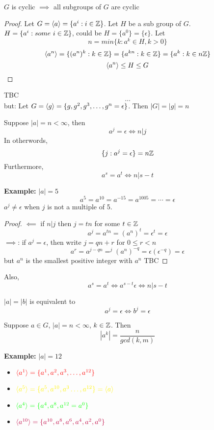 \documentclass[openany]{report}
\begin{document}
\begin{prop}
    $G$ is cyclic $\implies$ all subgroups of $G$ are cyclic
\end{prop}
\begin{proof}
    Let $G = \langle a \rangle = \{a^i : i \in \mathbb{Z}\}$. Let $H$ be a sub group of $G$. $H = \{a^i : some \ i\in \mathbb{Z}\}$, could be $H = \{a^0\} = \{\epsilon\}$. Let $$n = min\{k: a^k \in H, k > 0\}$$
        $$\langle a^n \rangle = \{(a^n)^k: k \in \mathbb{Z}\} = \{a^{kn} : k \in \mathbb{Z}\} = \{a^k: k \in n \mathbb{Z}\}$$ 
    $$\langle a^n \rangle \leq H \leq G$$
\end{proof}
TBC
$$\dots$$
but: Let $G = \langle g \rangle = \{g, g^2, g^3, \dots, g^n = \epsilon\}$. Then $|G| = |g| = n$
\begin{prop}
    Suppose $|a| = n < \infty$, then
    $$a^j = \epsilon \iff n|j$$
    In otherwords, 
    $$\{j: a^j = \epsilon\} = n\mathbb{Z}$$
    Furthermore, 
    $$a^s = a^t \iff n|s-t$$
\end{prop}
\textbf{Example:} $|a| = 5$ 
$$a^5 = a^{10} = a^{-15} = a^{1005} = \cdots = \epsilon$$
$a^j \neq \epsilon$ when $j$ is not a multiple of 5. 
\begin{proof}
    $\impliedby$ if $n|j$ then $j = tn$ for some $t\in \mathbb{Z}$
    $$a^j = a^{tn} = (a^n)^t = \epsilon^t = \epsilon$$
    $\implies$: if $a^j = \epsilon$, then write $j = qn + r$ for $0 \leq r < n$
    $$a^r = a^{j-qn} =
    ^j(a^n)^{-q} = \epsilon (\epsilon^{-q}) = \epsilon$$
     but $a^n$ is the smallest positive integer with $a^n$ TBC
\end{proof}
Also,
$$a^s = a^t \iff a^{s-t} \epsilon \iff n|s-t$$
\begin{corollary}
    $|a| = |b|$ is equivalent to 
    $$a^j = \epsilon \iff b^j = \epsilon$$
\end{corollary}
\begin{prop}
    Suppose $a \in G$, $|a| = n < \infty$, $k\in \mathbb{Z}$. Then
    $$|a^k| = \frac{n}{gcd(k,m)}$$
\end{prop}
\textbf{Example:} $|a| = 12$
\begin{itemize}
    \item $\textcolor{red}{\langle a^1 \rangle = \{a^1, a^2, a^3, \dots, a^{12}\}}$
    \item $\yellow{\bangles{a^5} = \{a^5, a^{10}, a^3 \dots, a^{12}\} = \bangles{a}}$
    \item $\textcolor{green}{\langle a^4 \rangle = \{a^4, a^8, a^{12} = a^0\}}$
    \item $\textcolor{purple}{\langle a^{10} \rangle = \{a^{10}, a^{8}, a^{6}, a^{4}, a^{2}, a^0\}}$
\end{itemize}
\end{document}
